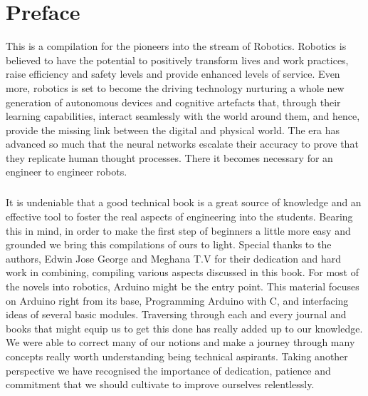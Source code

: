 \chapter*{Preface}
\begin{fullwidth}
\justify
\par This is a compilation for the pioneers into the stream of Robotics. Robotics is believed to have the potential to positively transform lives and work practices, raise efficiency and safety levels and provide enhanced levels of service. Even more, robotics is set to become the driving technology nurturing a whole new generation of autonomous devices and cognitive artefacts that, through their learning capabilities, interact seamlessly with the world around them, and hence, provide the missing link between the digital and physical world. The era has advanced so much that the neural networks escalate their accuracy to prove that they replicate human thought processes. There it becomes necessary for an engineer to engineer robots.
\vspace{5mm}
\paragraph{ } It is undeniable that a good technical book is a great source of knowledge and an effective tool to foster the real aspects of engineering into the students. Bearing this in mind, in order to make the first step of beginners a little more easy and grounded we bring this compilations of ours to light. Special thanks to the authors, Edwin Jose George and Meghana T.V for their dedication and hard work in combining, compiling various aspects discussed in this book. For most of the novels into robotics, Arduino might be the entry point. This material focuses on Arduino right from its base, Programming Arduino with C, and interfacing ideas of several basic modules. Traversing through each and every journal and books that might equip us to get this done has really added up to our knowledge. We were able to correct many of our notions and make a journey through many concepts really worth understanding being technical aspirants. Taking another perspective we have recognised the importance of dedication, patience and commitment that we should cultivate to improve ourselves relentlessly.
\end{fullwidth}